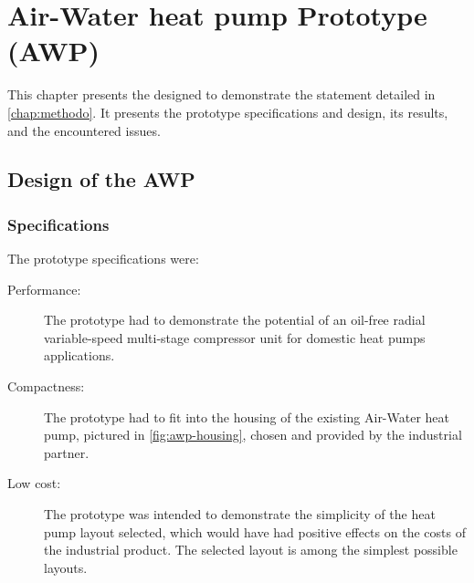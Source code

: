 \chapter{Air-Water heat pump Prototype (AWP)}
\label{chap:awp}
\resetallacronyms

\begin{shaded}
  This chapter presents the \AWP{} designed to demonstrate the
  statement detailed in \cref{chap:methodo}. It presents the prototype
  specifications and design, its results, and the encountered issues.
\end{shaded}

\section{Design of the AWP}
\label{sec:awp-design}

\subsection{Specifications}
\label{sec:awp-specs}

The prototype specifications were:
\begin{description}
\item[Performance:] The prototype had to demonstrate the potential of an
  oil-free radial variable-speed multi-stage compressor unit for
  domestic heat pumps applications.
\item[Compactness:] The prototype had to fit into the housing of the
  existing Air-Water heat pump, pictured in \cref{fig:awp-housing},
  chosen and provided by the industrial partner.
\item[Low cost:] The prototype was intended to demonstrate the
  simplicity of the heat pump layout selected, which would have had
  positive effects on the costs of the industrial
  product. The selected layout is among the simplest
  possible layouts.
\end{description}

